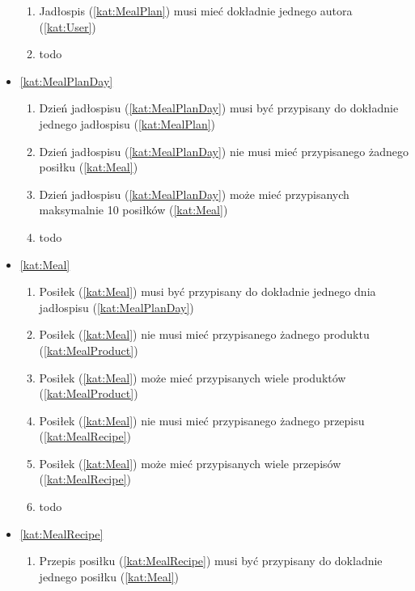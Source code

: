 \begin{itemize}[label={\textbf{Reguły dla}}, wide, labelwidth=!, labelindent=0pt]
\begin{enumerate}[label={\textbf{REG/\protect\threedigits{\arabic{enumi}}}}, wide, labelwidth=!, align=left, leftmargin=3cm, resume]
        \item Jadłospis (\ref{kat:MealPlan}) musi mieć dokładnie jednego autora (\ref{kat:User})
        \item todo
    \end{enumerate}
    \item\ref{kat:MealPlanDay}
    \begin{enumerate}[label={\textbf{REG/\protect\threedigits{\arabic{enumi}}}}, wide, labelwidth=!, align=left, leftmargin=3cm, resume]
        \item Dzień jadłospisu (\ref{kat:MealPlanDay}) musi być przypisany do dokładnie jednego jadłospisu (\ref{kat:MealPlan})
        \item Dzień jadłospisu (\ref{kat:MealPlanDay}) nie musi mieć przypisanego żadnego posiłku (\ref{kat:Meal})
        \item Dzień jadłospisu (\ref{kat:MealPlanDay}) może mieć przypisanych maksymalnie 10 posiłków (\ref{kat:Meal})
        \item todo
    \end{enumerate}
    \item\ref{kat:Meal}
    \begin{enumerate}[label={\textbf{REG/\protect\threedigits{\arabic{enumi}}}}, wide, labelwidth=!, align=left, leftmargin=3cm, resume]
        \item Posiłek (\ref{kat:Meal}) musi być przypisany do dokładnie jednego dnia jadłospisu (\ref{kat:MealPlanDay})
        \item Posiłek (\ref{kat:Meal}) nie musi mieć przypisanego żadnego produktu (\ref{kat:MealProduct})
        \item Posiłek (\ref{kat:Meal}) może mieć przypisanych wiele produktów (\ref{kat:MealProduct})
        \item Posiłek (\ref{kat:Meal}) nie musi mieć przypisanego żadnego przepisu (\ref{kat:MealRecipe})
        \item Posiłek (\ref{kat:Meal}) może mieć przypisanych wiele przepisów (\ref{kat:MealRecipe})
        \item todo
    \end{enumerate}
    \item\ref{kat:MealRecipe}
    \begin{enumerate}[label={\textbf{REG/\protect\threedigits{\arabic{enumi}}}}, wide, labelwidth=!, align=left, leftmargin=3cm, resume]
        \item Przepis posiłku (\ref{kat:MealRecipe}) musi być przypisany do dokladnie jednego posiłku (\ref{kat:Meal})

\end{enumerate}
\end{itemize}
